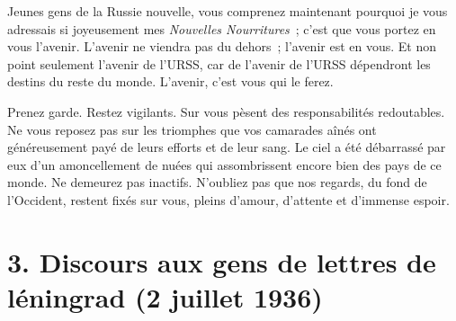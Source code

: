 \documentclass[twoside]{book} %
\begin{document}
Jeunes gens de la Russie nouvelle, vous comprenez maintenant pourquoi je vous adressais si joyeusement mes \emph{Nouvelles Nourritures} ; c’est que vous portez en vous l’avenir. L’avenir ne viendra pas du dehors ; l’avenir est en vous. Et non point seulement l’avenir de l’URSS, car de l’avenir de l’URSS dépendront les destins du reste du monde. L’avenir, c’est vous qui le ferez.\par
Prenez garde. Restez vigilants. Sur vous pèsent des responsabilités redoutables. Ne vous reposez pas sur les triomphes que vos camarades aînés ont généreusement payé de leurs efforts et de leur sang. Le ciel a été débarrassé par eux d’un amoncellement de nuées qui assombrissent encore bien des pays de ce monde. Ne demeurez pas inactifs. N’oubliez pas que nos regards, du fond de l’Occident, restent fixés sur vous, pleins d’amour, d’attente et d’immense espoir.

\section[{3. Discours aux gens de lettres de léningrad (2 juillet 1936)}]{3. Discours aux gens de lettres de léningrad (2 juillet 1936)}
\end{document}
